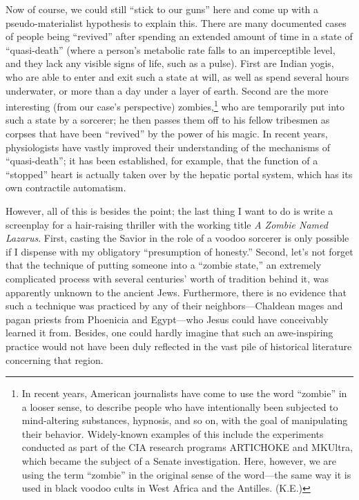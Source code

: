 Now of course, we could still ``stick to our guns'' here and come up with a pseudo-materialist hypothesis to explain this. There are many documented cases of people being ``revived'' after spending an extended amount of time in a state of ``quasi-death'' (where a person's metabolic rate falls to an imperceptible level, and they lack any visible signs of life, such as a pulse). First are Indian yogis, who are able to enter and exit such a state at will, as well as spend several hours underwater, or more than a day under a layer of earth. Second are the more interesting (from our case's perspective) zombies,\footnote{In recent years, American journalists have come to use the word ``zombie'' in a looser sense, to describe people who have intentionally been subjected to mind-altering substances, hypnosis, and so on, with the goal of manipulating their behavior. Widely-known examples of this include the experiments conducted as part of the CIA research programs ARTICHOKE and MKUltra, which became the subject of a Senate investigation. Here, however, we are using the term ``zombie'' in the original sense of the word---the same way it is used in black voodoo cults in West Africa and the Antilles. (K.E.)} who are temporarily put into such a state by a sorcerer; he then passes them off to his fellow tribesmen as corpses that have been ``revived'' by the power of his magic. In recent years, physiologists have vastly improved their understanding of the mechanisms of ``quasi-death''; it has been established, for example, that the function of a ``stopped'' heart is actually taken over by the hepatic portal system, which has its own contractile automatism.

However, all of this is besides the point; the last thing I want to do is write a screenplay for a hair-raising thriller with the working title \emph{A Zombie Named Lazarus}. First, casting the Savior in the role of a voodoo sorcerer is only possible if I dispense with my obligatory ``presumption of honesty.'' Second, let's not forget that the technique of putting someone into a ``zombie state,'' an extremely complicated process with several centuries' worth of tradition behind it, was apparently unknown to the ancient Jews. Furthermore, there is no evidence that such a technique was practiced by any of their neighbors---Chaldean mages and pagan priests from Phoenicia and Egypt---who Jesus could have conceivably learned it from. Besides, one could hardly imagine that such an awe-inspiring practice would not have been duly reflected in the vast pile of historical literature concerning that region.

